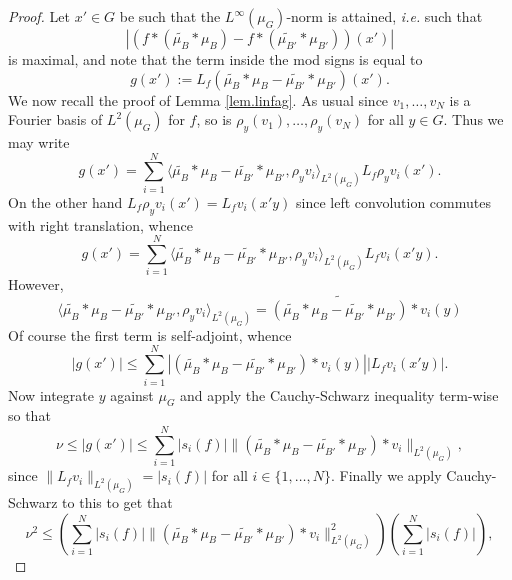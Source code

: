 \documentclass[12pt]{amsart}
\numberwithin{equation}{section}
\theoremstyle{plain}
\theoremstyle{definition}
\renewcommand{\leq}{\leqslant}
\begin{document}
\begin{proof}
Let $x' \in G$ be such that the $L^\infty(\mu_G)$-norm is attained, \emph{i.e.} such that
\begin{equation*}
|(f \ast(\widetilde{\mu_B}\ast \mu_B) - f \ast (\widetilde{\mu_{B'}}\ast \mu_{B'}))(x')|
\end{equation*}
is maximal, and note that the term inside the mod signs is equal to
\begin{equation}\label{eqn.rui}
g(x'):=L_f(\widetilde{\mu_B}\ast \mu_B - \widetilde{\mu_{B'}}\ast \mu_{B'})(x').
\end{equation}
We now recall the proof of Lemma \ref{lem.linfag}.  As usual since $v_1,\dots,v_N$ is a Fourier basis of $L^2(\mu_G)$ for $f$, so is $\rho_y(v_1),\dots,\rho_y(v_N)$ for all $y \in G$.  Thus we may write
\begin{equation*}
g(x') = \sum_{i=1}^N{\langle \widetilde{\mu_B}\ast \mu_B - \widetilde{\mu_{B'}}\ast \mu_{B'},\rho_yv_i\rangle_{L^2(\mu_G)}L_f\rho_yv_i(x')}.
\end{equation*}
On the other hand $L_f\rho_yv_i(x') = L_fv_i(x'y)$ since left convolution commutes with right translation, whence
\begin{equation*}
g(x')= \sum_{i=1}^N{\langle \widetilde{\mu_B}\ast \mu_B - \widetilde{\mu_{B'}}\ast \mu_{B'},\rho_yv_i\rangle_{L^2(\mu_G)}L_fv_i(x'y)}.
\end{equation*}
However,
\begin{equation*}
\langle \widetilde{\mu_B}\ast \mu_B - \widetilde{\mu_{B'}}\ast \mu_{B'},\rho_yv_i\rangle_{L^2(\mu_G)}= \widetilde{( \widetilde{\mu_B}\ast \mu_B - \widetilde{\mu_{B'}}\ast \mu_{B'})} \ast v_i(y)
\end{equation*}
Of course the first term is self-adjoint, whence
\begin{equation*}
|g(x')| \leq \sum_{i=1}^N{| (\widetilde{\mu_B}\ast \mu_B - \widetilde{\mu_{B'}}\ast \mu_{B'}) \ast v_i(y)||L_fv_i(x'y)|}.
\end{equation*}
Now integrate $y$ against $\mu_G$ and apply the Cauchy-Schwarz inequality term-wise so that
\begin{equation*}
\nu \leq |g(x')| \leq  \sum_{i=1}^N{|s_i(f)|\|(\widetilde{\mu_B}\ast \mu_B - \widetilde{\mu_{B'}}\ast \mu_{B'}) \ast v_i\|_{L^2(\mu_G)}},
\end{equation*}
since $\|L_fv_i\|_{L^2(\mu_G)}=|s_i(f)|$ for all $i \in \{1,\dots,N\}$.  Finally we apply Cauchy-Schwarz to this to get that
\begin{equation*}
\nu^2 \leq \left(\sum_{i=1}^N{|s_i(f)|\|(\widetilde{\mu_B}\ast \mu_B - \widetilde{\mu_{B'}}\ast \mu_{B'}) \ast v_i\|_{L^2(\mu_G)}^2}\right)\left(\sum_{i=1}^N{|s_i(f)|}\right),

\end{equation*}
\end{proof}
\end{document}
